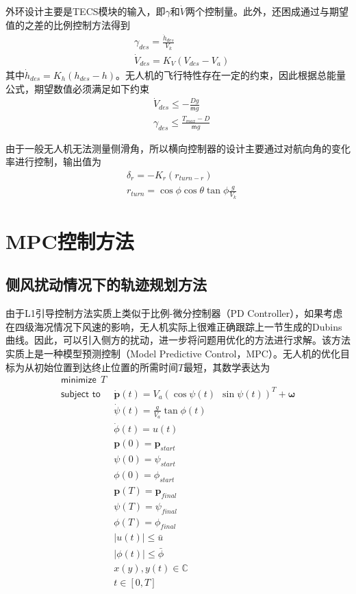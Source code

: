 外环设计主要是TECS模块的输入，即$\gamma$和$\dot{V}$两个控制量。此外，还困成通过与期望值的之差的比例控制方法得到
\begin{align}
&\gamma_{des} = \frac{\dot{h}_{des}}{V_k} \\
&\dot{V}_{des} = K_V(V_{des}-V_a) 
\end{align}
其中$\dot{h}_{des} = K_h(h_{des}-h)$。无人机的飞行特性存在一定的约束，因此根据总能量公式，期望数值必须满足如下约束
\begin{align}
&\dot{V} _{des} \le -\frac{Dg}{\mathsf{m}g} \\
&\gamma_{des} \le \frac{T_{max} - D}{\mathsf{m}g}
\end{align}

由于一般无人机无法测量侧滑角，所以横向控制器的设计主要通过对航向角的变化率进行控制，输出值为
\begin{align}
&\delta_r = -K_r (r_{turn - r}) \\
&r_{turn} = \cos \phi \cos \theta \tan \phi \frac{g}{V_k}
\end{align}

\section{MPC控制方法}

\subsection{侧风扰动情况下的轨迹规划方法}
由于L1引导控制方法实质上类似于比例-微分控制器（PD Controller），如果考虑在四级海况情况下风速的影响，无人机实际上很难正确跟踪上一节生成的Dubins曲线。因此，可以引入侧方的扰动，进一步将问题用优化的方法进行求解。该方法实质上是一种模型预测控制（Model Predictive Control，MPC）。无人机的优化目标为从初始位置到达终止位置的所需时间$T$最短，其数学表达为 
\begin{align}
	\textsf{minimize}\ \ T \label{eq:gust_dubins_1} \\
	\textsf{subject to}\  \ &\dot{\mathbf{p}}(t) = {V}_a(\cos \psi(t)\ \ \sin \psi(t))^T + \mathbf{\omega}  \nonumber \\
	& \dot{\psi}(t) = \frac{g}{{V}_a} \tan \phi(t) \nonumber \\
	& \dot{\phi}(t) = u(t) \nonumber \\
	& \mathbf{p}(0) = \mathbf{p}_{start} \nonumber \\
	& \psi(0) = \psi_{start} \nonumber \\
	& \phi(0) = \phi_{start} \nonumber \\
	& \mathbf{p}(T) = \mathbf{p}_{final} \nonumber \\
	& \psi(T) = \psi_{final} \nonumber \\
	& \phi(T) = \phi_{final} \nonumber \\
	& |u(t)| \le \bar{u}  \nonumber \\
	& |\phi(t)| \le \bar{\phi} \nonumber \\
	& x(y), y(t) \in \mathbb{C} \nonumber \\
	& t \in [0, T] \nonumber
\end{align}

